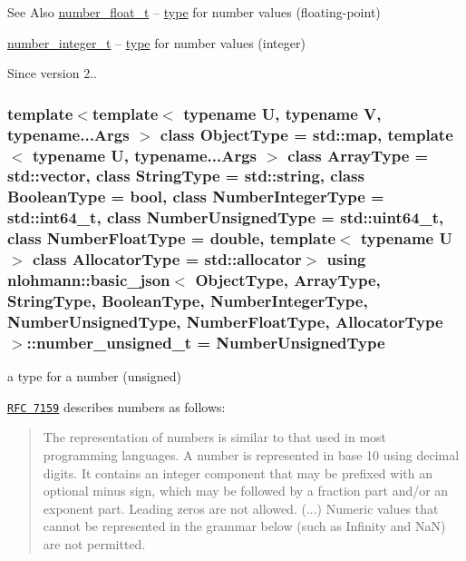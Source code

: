 \begin{DoxySeeAlso}{See Also}
\hyperlink{classnlohmann_1_1basic__json_a74a0013e847fdc574b48f931f0e757e1}{number\-\_\-float\-\_\-t} -- \hyperlink{classnlohmann_1_1basic__json_a5d466b240d0ba9f648d7fd4ff42359f5}{type} for number values (floating-\/point)

\hyperlink{classnlohmann_1_1basic__json_ac4b10b2364f26ce47bdb9a413ff04a59}{number\-\_\-integer\-\_\-t} -- \hyperlink{classnlohmann_1_1basic__json_a5d466b240d0ba9f648d7fd4ff42359f5}{type} for number values (integer)
\end{DoxySeeAlso}
\begin{DoxySince}{Since}
version 2.. 
\end{DoxySince}
\hypertarget{classnlohmann_1_1basic__json_a60a04166c122072ab11eaf9845d9cd1d}{
\subsubsection[{number\-\_\-unsigned\-\_\-t}]{\setlength{\rightskip}{0pt plus 5cm}template$<$template$<$ typename U, typename V, typename...\-Args $>$ class Object\-Type = std\-::map, template$<$ typename U, typename...\-Args $>$ class Array\-Type = std\-::vector, class String\-Type  = std\-::string, class Boolean\-Type  = bool, class Number\-Integer\-Type  = std\-::int64\-\_\-t, class Number\-Unsigned\-Type  = std\-::uint64\-\_\-t, class Number\-Float\-Type  = double, template$<$ typename U $>$ class Allocator\-Type = std\-::allocator$>$ using {\bf nlohmann\-::basic\-\_\-json}$<$ Object\-Type, Array\-Type, String\-Type, Boolean\-Type, Number\-Integer\-Type, Number\-Unsigned\-Type, Number\-Float\-Type, Allocator\-Type $>$\-::{\bf number\-\_\-unsigned\-\_\-t} =  Number\-Unsigned\-Type}}\label{classnlohmann_1_1basic__json_a60a04166c122072ab11eaf9845d9cd1d}


a type for a number (unsigned) 

\href{http://rfc7159.net/rfc7159}{\tt R\-F\-C 7159} describes numbers as follows\-: \begin{quotation}
The representation of numbers is similar to that used in most programming languages. A number is represented in base 10 using decimal digits. It contains an integer component that may be prefixed with an optional minus sign, which may be followed by a fraction part and/or an exponent part. Leading zeros are not allowed. (...) Numeric values that cannot be represented in the grammar below (such as Infinity and Na\-N) are not permitted.

\end{quotation}


